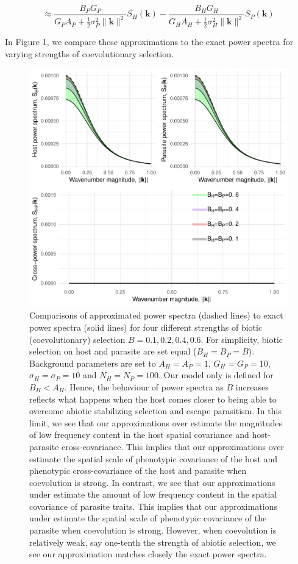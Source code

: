 \documentclass{article}
\begin{document}
\[\approx\frac{B_PG_P}{G_PA_P+\frac{1}{2}\sigma_P^2\|\pmb k\|^2}S_H(\pmb k)-\frac{B_HG_H}{G_HA_H+\frac{1}{2}\sigma_H^2\|\pmb k\|^2}S_P(\pmb k)\]

In Figure 1, we compare these approximations to the exact power spectra
for varying strengths of coevolutionary selection.

\begin{figure}
\centering
\includegraphics{Spatial-Scales-of-Local-Adaptation-in-Host-Parasite-Coevolution_files/figure-latex/unnamed-chunk-1-1.pdf}
\caption{Comparisons of approximated power spectra (dashed lines) to
exact power spectra (solid lines) for four different strengths of biotic
(coevolutionary) selection \(B=0.1,0.2,0.4,0.6\). For simplicity, biotic
selection on host and parasite are set equal (\(B_H=B_P=B\)). Background
parameters are set to \(A_H=A_P=1\), \(G_H=G_P=10\),
\(\sigma_H=\sigma_P=10\) and \(N_H=N_P=100\). Our model only is defined
for \(B_H<A_H\). Hence, the behaviour of power spectra as \(B\)
increases reflects what happens when the host comes closer to being able
to overcome abiotic stabilizing selection and escape parasitism. In this
limit, we see that our approximations over estimate the magnitudes of
low frequency content in the host spatial covariance and host-parasite
cross-covariance. This implies that our approximations over estimate the
spatial scale of phenotypic covariance of the host and phenotypic
cross-covariance of the host and parasite when coevolution is strong. In
contrast, we see that our approximations under estimate the amount of
low frequency content in the spatial covariance of parasite traits. This
implies that our approximations under estimate the spatial scale of
phenotypic covariance of the parasite when coevolution is strong.
However, when coevolution is relatively weak, say one-tenth the strength
of abiotic selection, we see our approximation matches closely the exact
power spectra.}
\end{figure}
\end{document}

